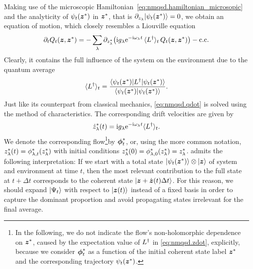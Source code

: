 Making use of the microscopic Hamiltonian~\ref{eq:nmqsd.hamiltonian_microsopic} and the analyticity of $\psitz$ in ${\boldsymbol{z}}^*$, that is $\partial_{z_\lambda} \ket{\psitz} = 0$, we obtain an equation of motion, which closely resembles a Liouville equation
\begin{equation}
  \partial_t Q_t(\zz, \cc\zz) = - \sum_\lambda \partial_{\cc z_\lambda} \big( \ii g_\lambda \exp[-\ii \omega_\lambda t] \, \qmean{\adj L}_t \, Q_t(\zz, \cc\zz) \big) - \mathrm{c.c.}
  \label{eq:nmqsd.qdot}
\end{equation}
Clearly, it contains the full influence of the system on the environment due to the quantum average
\begin{equation*}
  \qmean{\adj L}_t = \frac{\bra{\psitz} \adj L \ket{\psitz}}{\braket{\psitz}{\psitz}}.
\end{equation*}
Just like its counterpart from classical mechanics, \autoref{eq:nmqsd.qdot} is solved using the method of characteristics.
The corresponding drift velocities are given by
\begin{equation}
  \cc{\dot z}_\lambda(t) = \ii g_\lambda \exp[-\ii \omega_\lambda t] \qmean{\adj L}_t.
  \label{eq:nmqsd.zdot}
\end{equation}
We denote the corresponding flow\footnote{%
  In the following, we do not indicate the flow's non-holomorphic dependence on ${\boldsymbol{z}}^*$, caused by the expectation value of $L^\dagger$ in \autoref{eq:nmqsd.zdot}, explicitly, because we consider ${\boldsymbol{\phi}}^*_t$ as a function of the initial coherent state label ${\boldsymbol{z}}^*$ and the corresponding trajectory $\psitz$.
}by ${\boldsymbol{\phi}}^*_t$, or, using the more common notation, ${z}^*_\lambda(t) = {\phi}^*_{\lambda,t}({z}^*_\lambda)$ with initial conditions ${z}^*_\lambda(0) = {\phi}^*_{\lambda, 0}({z}^*_\lambda) = {z}^*_\lambda$.
 admits the following interpretation:
If we start with a total state $\ket{\psitz}\otimes\ket{\zz}$ of system and environment at time $t$, then the most relevant contribution to the full state at $t + \Delta t$ corresponds to the coherent state $| \boldsymbol{z} + \dot{\boldsymbol{z}}(t) \Delta t \rangle$.
For this reason, we should expand $| \Psi_t \rangle$ with respect to $| \boldsymbol{z}(t) \rangle$ instead of a fixed basis in order to capture the dominant proportion and avoid propagating states irrelevant for the final average.

